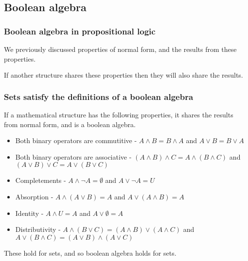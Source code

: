 
\subsection{Boolean algebra}

\subsubsection{Boolean algebra in propositional logic}

We previously discussed properties of normal form, and the results from these properties.

If another structure shares these properties then they will also share the results.

\subsubsection{Sets satisfy the definitions of a boolean algebra}

If a mathematical structure has the following properties, it shares the results from normal form, and is a boolean algebra.

\begin{itemize}
\item Both binary operators are commutitive - \(A\land B=B\land A\) and \(A\lor B=B\lor A\)
\item Both binary operators are associative - \((A\land B)\land C=A\land (B\land C)\) and \((A\lor B)\lor C=A\lor (B\lor C)\)
\item Completements - \(A\land ¬A=\emptyset \) and \(A\lor ¬A=U\)
\item Absorption - \(A\land (A\lor B)=A\) and \(A\lor (A\land B)=A\)
\item Identity - \(A\land U=A\) and \(A\lor \emptyset =A\)
\item Distributivity - \(A\land (B\lor C)=(A\land B)\lor (A\land C)\) and \(A\lor (B\land C)=(A\lor B)\land(A\lor C)\)
\end{itemize}

These hold for sets, and so boolean algebra holds for sets.

